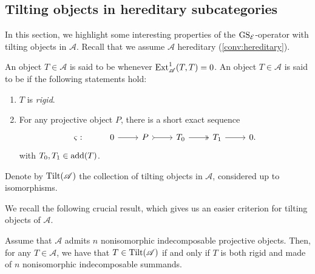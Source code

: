 \subsection{Tilting objects in hereditary subcategories}
\label{ss:Tilting} In this section, we highlight some interesting properties of the $\operatorname{GS}_\mathcal{E}$-operator with tilting objects in $\mathscr{A}$. Recall that we assume $\mathscr{A}$ hereditary (\cref{conv:hereditary}).

\begin{definition}
\label{def:rigidtilting}
An object $T \in \mathscr{A}$ is said to be  whenever $\operatorname{Ext}_\mathscr{A}^1(T,T) = 0$. An object $T \in \mathscr{A}$ is said to be  if the following statements hold:
\begin{enumerate}[label=$\bullet$, itemsep=1mm]
\item $T$ is \emph{rigid}.
\item For any projective object $P$, there is a short exact sequence 
\[\begin{tikzcd}
	\varsigma: & 0 & P & T_0 & T_1&  0.
	\arrow[from=1-2, to=1-3]
	\arrow[tail, from=1-3, to=1-4]
	\arrow[two heads,from=1-4, to=1-5]
	\arrow[from=1-5, to=1-6]
\end{tikzcd}\] with $T_0,T_1 \in \operatorname{add}(T)$.
\end{enumerate} 
Denote by $\operatorname{Tilt}(\mathscr{A})$ the collection of tilting objects in $\mathscr{A}$, considered up to isomorphisms.
\end{definition}



We recall the following crucial result, which gives us an easier criterion for tilting objects of $\mathscr{A}$.

\begin{prop} \label{prop:numberindectilt}
Assume that $\mathscr{A}$ admits $n$ nonisomorphic indecomposable projective objects. Then, for any $T \in \mathscr{A}$, we have that $T \in \operatorname{Tilt}(\mathscr{A})$ if and only if $T$ is both rigid and made of $n$ nonisomorphic indecomposable summands.
\end{prop}


